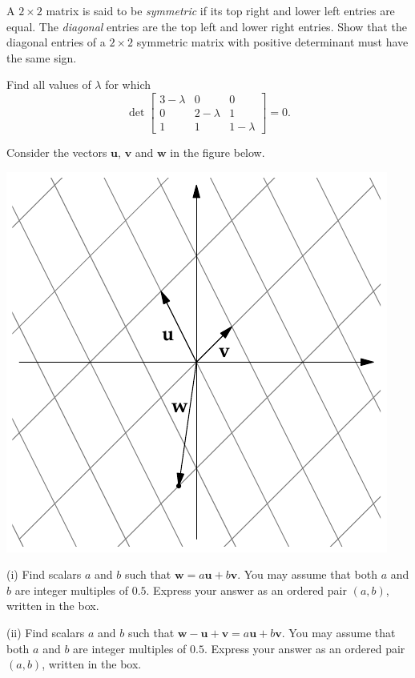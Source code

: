\documentclass{watsonbook}
\begin{document}

\begin{aexercise}
  A $2\times 2$ matrix is said to be \textit{symmetric} if its top
  right and lower left entries are equal. The \textit{diagonal}
  entries are the top left and lower right entries. Show that the
  diagonal entries of a $2\times 2$ symmetric matrix with positive
  determinant must have the same sign.
\end{aexercise}

\begin{aexercise}
  Find all values of $\lambda$ for which 
  \[
    \det \left[
      \begin{array}{ccc}
        3 - \lambda & 0 & 0 \\
        0 & 2-\lambda & 1 \\
        1 & 1 & 1 - \lambda
      \end{array}
    \right]
    = 0. 
  \]
\end{aexercise}

\newpage 


\begin{aexercise}
  Consider the vectors $\mathbf{u}$, $\mathbf{v}$ and $\mathbf{w}$ in
  the figure below.

  \begin{center}
    \includegraphics{exercisefigures/parallelogram}
  \end{center}

  (i) Find scalars $a$ and $b$ such that
  $\mathbf{w} = a\mathbf{u} + b\mathbf{v}$. You may assume that both $a$
  and $b$ are integer multiples of $0.5$. Express your answer as an
  ordered pair $(a,b)$, written in the box.

  (ii) Find scalars $a$ and $b$ such that
  $\mathbf{w} - \mathbf{u} + \mathbf{v} = a\mathbf{u} +
  b\mathbf{v}$. You may assume that both $a$ and $b$ are integer
  multiples of $0.5$. Express your answer as an ordered pair $(a,b)$,
  written in the box.
\end{aexercise}
\end{document}
